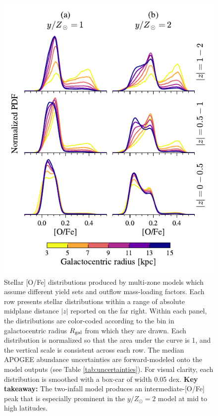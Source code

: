 \documentclass[twocolumn,twocolappendix,linenumbers]{aastex631}
\newcommand{\yZ}[1]{$y/Z_\odot=#1$}
\begin{document}
\begin{figure}
    \centering
    \includegraphics[width=\linewidth]{src/tex/figures/ofe_distribution_yields.pdf}
    \caption{Stellar [O/Fe] distributions produced by multi-zone models which assume different yield sets and outflow mass-loading factors. Each row presents stellar distributions within a range of absolute midplane distance $|z|$ reported on the far right. Within each panel, the distributions are color-coded according to the bin in galactocentric radius $R_{\rm gal}$ from which they are drawn. Each distribution is normalized so that the area under the curve is 1, and the vertical scale is consistent across each row. The median APOGEE abundance uncertainties are forward-modeled onto the model outputs (see Table \ref{tab:uncertainties}). For visual clarity, each distribution is smoothed with a box-car of width 0.05 dex. {\bf Key takeaway:} The two-infall model produces an intermediate-[O/Fe] peak that is especially prominent in the \yZ{2} model at mid to high latitudes.}
    \label{fig:ofe-distribution-yields}
\end{figure}
\end{document}
